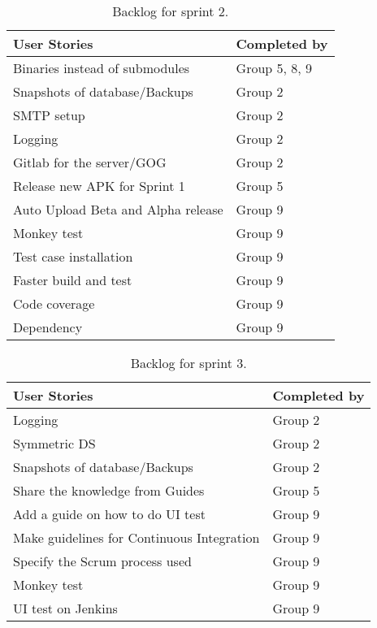 \begin{table}
	\centering
	\begin{tabular}{ll}
		\textbf{User Stories} & \textbf{Completed by}\\ \hline \noalign{\vskip 2mm}
		Binaries instead of submodules & Group 5, 8, 9\\ \hline
		Snapshots of database/Backups & Group 2\\ \hline
		SMTP setup & Group 2\\ \hline
		Logging & Group 2\\ \hline
		Gitlab for the server/GOG & Group 2\\ \hline
		Release new APK for Sprint 1 & Group 5\\ \hline
		Auto Upload Beta and Alpha release & Group 9\\ \hline
		Monkey test & Group 9\\ \hline
		Test case installation & Group 9\\ \hline
		Faster build and test & Group 9\\ \hline
		Code coverage & Group 9\\ \hline
		Dependency & Group 9\\ \hline
	\end{tabular}
	\caption{Backlog for sprint 2.}
	\label{Roles_ReleaseBacklogSprint2_table}
\end{table}

\begin{table}
	\centering
	\begin{tabular}{ll}
		\textbf{User Stories} & \textbf{Completed by}\\ \hline \noalign{\vskip 2mm}
		Logging & Group 2\\ \hline
		Symmetric DS & Group 2\\ \hline
		Snapshots of database/Backups & Group 2\\ \hline
		Share the knowledge from Guides & Group 5\\ \hline
		Add a guide on how to do UI test & Group 9\\ \hline
		Make guidelines for Continuous Integration & Group 9\\ \hline
		Specify the Scrum process used & Group 9\\ \hline
		Monkey test & Group 9\\ \hline
		UI test on Jenkins & Group 9\\ \hline
	\end{tabular}
	\caption{Backlog for sprint 3.}
	\label{Roles_ReleaseBacklogSprint3_table}
\end{table}